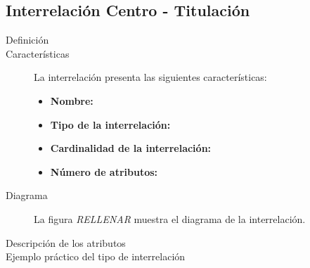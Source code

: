 \subsection{Interrelación Centro - Titulación}

   \begin{description}
      \item[Definición]

      \item[Características] La interrelación presenta las siguientes
                             características:

         \begin{itemize}
            \item \textbf{Nombre:}
            \item \textbf{Tipo de la interrelación:}
            \item \textbf{Cardinalidad de la interrelación:}
            \item \textbf{Número de atributos:}
         \end{itemize}

      \item[Diagrama] La figura \textit{RELLENAR} muestra el diagrama de la
                      interrelación.

      \item[Descripción de los atributos]

      \item[Ejemplo práctico del tipo de interrelación]
   \end{description}
